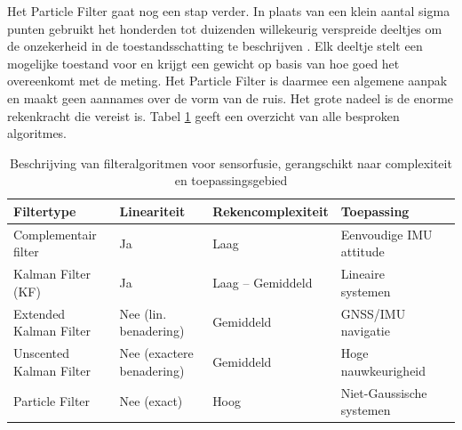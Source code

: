 Het Particle Filter gaat nog een stap verder. In plaats van een klein aantal sigma punten gebruikt het 
honderden tot duizenden willekeurig verspreide deeltjes om de onzekerheid in de toestandsschatting te beschrijven \cite{boers_particle_filter}. Elk deeltje stelt een mogelijke toestand voor en krijgt een gewicht op basis van hoe goed het overeenkomt met de meting. Het Particle Filter is daarmee een algemene aanpak en maakt geen aannames over de vorm van de ruis. Het grote nadeel is de enorme rekenkracht die vereist is. Tabel \ref{tab:filteralgoritmen} geeft een overzicht van alle besproken algoritmes.

\begin{table}[htbp]
    \centering
    \caption{Beschrijving van filteralgoritmen voor sensorfusie, gerangschikt 
    naar complexiteit en toepassingsgebied}
    \label{tab:filteralgoritmen}
    \renewcommand{\arraystretch}{1.3}
    \begin{tabularx}{\textwidth}{|l|X|l|l|X|}
        \hline
        \rowcolor{green!20}
        \textbf{Filtertype} & 
        \textbf{Lineariteit} & 
        \textbf{Rekencomplexiteit} & 
        \textbf{Toepassing} \\ \hline
        Complementair filter & 
        Ja & 
        Laag & 
        Eenvoudige IMU attitude \\ \hline
        Kalman Filter (KF) & 
        Ja & 
        Laag -- Gemiddeld & 
        Lineaire systemen \\ \hline
        Extended Kalman Filter & 
        Nee (lin. benadering) & 
        Gemiddeld & 
        GNSS/IMU navigatie \\ \hline
        Unscented Kalman Filter & 
        Nee (exactere benadering) & 
        Gemiddeld & 
        Hoge nauwkeurigheid \\ \hline
        Particle Filter & 
        Nee (exact) & 
        Hoog & 
        Niet-Gaussische systemen \\ \hline
    \end{tabularx}
\end{table}


\newpage